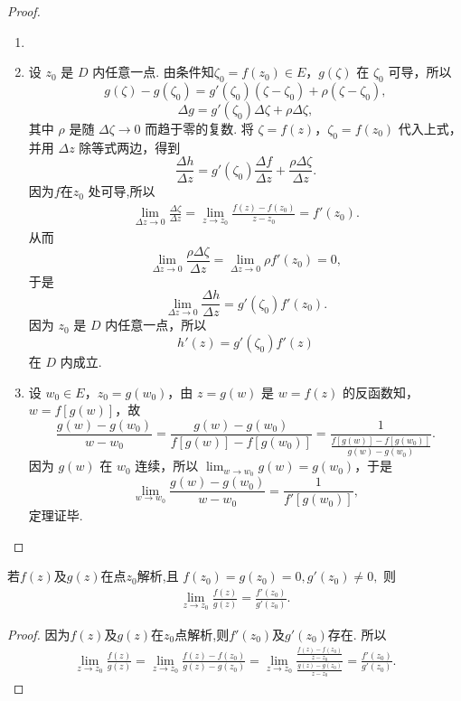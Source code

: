 \documentclass[../../main.tex]{subfiles}%
\begin{document}
\begin{proof}
\begin{enumerate}[(1)]
\item 

\item 设 \( z_0 \) 是 \( D \) 内任意一点. 由条件知\( \zeta_0 = f(z_0) \in E \)，\( g(\zeta) \) 在 \( \zeta_0 \) 可导，所以
\[
g(\zeta) - g(\zeta_0) = g'(\zeta_0)(\zeta - \zeta_0) + \rho(\zeta - \zeta_0),
\]
\[
\Delta g = g'(\zeta_0)\Delta \zeta + \rho \Delta \zeta,
\]
其中 \( \rho \) 是随 \( \Delta \zeta \to 0 \) 而趋于零的复数. 将 \( \zeta = f(z) \)，\( \zeta_0 = f(z_0) \) 代入上式，并用 \( \Delta z \) 除等式两边，得到
\[
\frac{\Delta h}{\Delta z} = g'(\zeta_0)\frac{\Delta f}{\Delta z} + \frac{\rho \Delta \zeta}{\Delta z}.
\]
因为$f$在$z_0$ 处可导,所以
\begin{align*}
\lim_{\Delta z\rightarrow 0} \frac{\Delta \zeta}{\Delta z}=\lim_{z\rightarrow z_0} \frac{f\left( z \right) -f\left( z_0 \right)}{z-z_0}=f'\left( z_0 \right) .
\end{align*}
从而
\[
\lim_{\Delta z\rightarrow 0} \frac{\rho \Delta \zeta}{\Delta z}=\lim_{\Delta z\rightarrow 0} \rho f' \left( z_0 \right) =0,
\]
于是
\[
\lim_{\Delta z \to 0} \frac{\Delta h}{\Delta z} = g'(\zeta_0)f'(z_0).
\]
因为 \( z_0 \) 是 \( D \) 内任意一点，所以
\[
h'(z) = g'(\zeta_0)f'(z)
\]
在 \( D \) 内成立.

\item 设 \( w_0 \in E \)，\( z_0 = g(w_0) \)，由 \( z = g(w) \) 是 \( w = f(z) \) 的反函数知，\( w = f[g(w)] \)，故
\[
\frac{g(w) - g(w_0)}{w - w_0} = \frac{g(w) - g(w_0)}{f[g(w)] - f[g(w_0)]} = \frac{1}{\frac{f[g(w)] - f[g(w_0)]}{g(w) - g(w_0)}}.
\]
因为 \( g(w) \) 在 \( w_0 \) 连续，所以 \( \lim_{w \to w_0} g(w) = g(w_0) \)，于是
\[
\lim_{w \to w_0} \frac{g(w) - g(w_0)}{w - w_0} = \frac{1}{f'[g(w_0)]},
\]
定理证毕.
\end{enumerate}
\end{proof}

\begin{theorem}\label{theorem:L'Hospital(洛必达)法则}
若$f(z)$及$g(z)$在点$z_0$解析,且
$f(z_0)=g(z_0)=0,g'(z_0)\neq 0,$
则
\begin{align*}
\lim\limits_{z \to z_0} \frac{f(z)}{g(z)} = \frac{f'(z_0)}{g'(z_0)}.
\end{align*}
\end{theorem}
\begin{proof}
因为$f(z)$及$g(z)$在$z_0$点解析,则$f'(z_0)$及$g'(z_0)$存在.
所以
\begin{align*}
\lim\limits_{z \to z_0} \frac{f(z)}{g(z)} = \lim\limits_{z \to z_0} \frac{f(z)-f(z_0)}{g(z)-g(z_0)} = \lim\limits_{z \to z_0} \frac{\frac{f(z)-f(z_0)}{z-z_0}}{\frac{g(z)-g(z_0)}{z-z_0}} = \frac{f'(z_0)}{g'(z_0)}.
\end{align*}

\end{proof}
\end{document}
